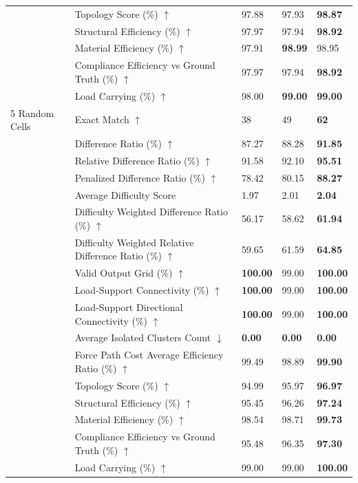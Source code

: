 \begin{table}[!h]
{\begin{tabular}{lllll}
 & Topology Score (\%) $\uparrow$ & 97.88 & 97.93 & \textbf{98.87} \\
 & Structural Efficiency (\%) $\uparrow$ & 97.97 & 97.94 & \textbf{98.92} \\
 & Material Efficiency (\%) $\uparrow$ & 97.91 & \textbf{98.99} & 98.95 \\
 & Compliance Efficiency vs Ground Truth (\%) $\uparrow$ & 97.97 & 97.94 & \textbf{98.92} \\
 & Load Carrying (\%) $\uparrow$ & 98.00 & \textbf{99.00} & \textbf{99.00} \\
5 Random Cells & Exact Match $\uparrow$ & 38 & 49 & \textbf{62} \\
 & Difference Ratio (\%) $\uparrow$ & 87.27 & 88.28 & \textbf{91.85} \\
 & Relative Difference Ratio (\%) $\uparrow$ & 91.58 & 92.10 & \textbf{95.51} \\
 & Penalized Difference Ratio (\%) $\uparrow$ & 78.42 & 80.15 & \textbf{88.27} \\
 & Average Difficulty Score & 1.97 & 2.01 & \textbf{2.04} \\
 & Difficulty Weighted Difference Ratio (\%) $\uparrow$ & 56.17 & 58.62 & \textbf{61.94} \\
 & Difficulty Weighted Relative Difference Ratio (\%) $\uparrow$ & 59.65 & 61.59 & \textbf{64.85} \\
 & Valid Output Grid (\%) $\uparrow$ & \textbf{100.00} & 99.00 & \textbf{100.00} \\
 & Load-Support Connectivity (\%) $\uparrow$ & \textbf{100.00} & 99.00 & \textbf{100.00} \\
 & Load-Support Directional Connectivity (\%) $\uparrow$ & \textbf{100.00} & 99.00 & \textbf{100.00} \\
 & Average Isolated Clusters Count $\downarrow$ & \textbf{0.00} & \textbf{0.00} & \textbf{0.00} \\
 & Force Path Cost Average Efficiency Ratio (\%) $\uparrow$ & 99.49 & 98.89 & \textbf{99.90} \\
 & Topology Score (\%) $\uparrow$ & 94.99 & 95.97 & \textbf{96.97} \\
 & Structural Efficiency (\%) $\uparrow$ & 95.45 & 96.26 & \textbf{97.24} \\
 & Material Efficiency (\%) $\uparrow$ & 98.54 & 98.71 & \textbf{99.73} \\
 & Compliance Efficiency vs Ground Truth (\%) $\uparrow$ & 95.48 & 96.35 & \textbf{97.30} \\
 & Load Carrying (\%) $\uparrow$ & 99.00 & 99.00 & \textbf{100.00} \\

\end{tabular}}
\end{table}
